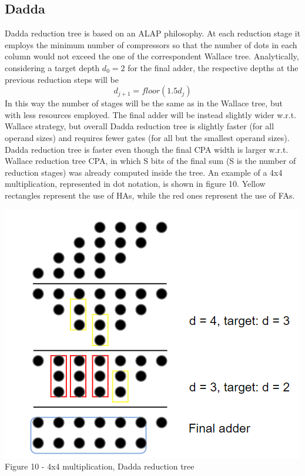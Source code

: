 \documentclass[11pt]{article} %
\begin{document}
\subsection{Dadda}
Dadda reduction tree is based on an ALAP philosophy. At each reduction stage it employs the minimum number of compressors so that the number of dots in each column would not exceed the one of the correspondent Wallace tree. Analytically, considering a target depth $d_0 = 2$ for the final adder, the respective depths at the previous reduction steps will be $$ d_{j+1}=floor(1.5d_j)$$ In this way the number of stages will be the same as in the Wallace tree, but with less resources employed. The final adder will be instead slightly wider w.r.t. Wallace strategy, but overall Dadda reduction tree is slightly faster (for all operand sizes) and requires fewer gates (for all but the smallest operand sizes). Dadda reduction tree is faster even though the final CPA width is larger w.r.t. Wallace reduction tree CPA, in which S bits of the final sum (S is the number of reduction stages) was already computed inside the tree. An example of a 4x4 multiplication, represented in dot notation, is shown in figure 10. Yellow rectangles represent the use of HAs, while the red ones represent the use of FAs.
\vspace{1em}
\begin{center}
\includegraphics[scale=.48]{dadda4x4.PNG}\\
\small{Figure 10 - 4x4 multiplication, Dadda reduction tree}
\end{center}
\end{document}
